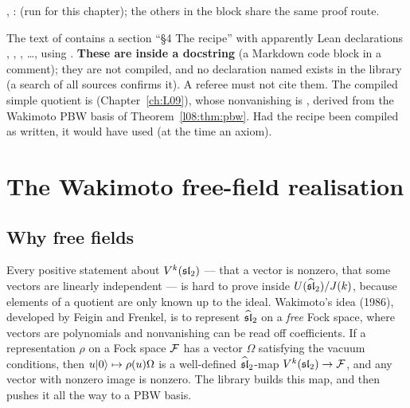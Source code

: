 \begin{status}
\allowbreak{}\allowbreak{}\allowbreak{}\allowbreak{}\allowbreak{}\allowbreak{}, \allowbreak{}\allowbreak{}\allowbreak{}\allowbreak{}\allowbreak{}:
\lean{[propext, Classical.}\allowbreak{}\allowbreak\lean{sound]} (run for this chapter); the others in the block share
the same proof route.
\end{status}

\begin{warning}[title={A documentation-only definition of $L_k(\mathfrak{sl}_2)$}]
The text of  contains a section ``\S4 The recipe''
with apparently Lean declarations \allowbreak{}, \allowbreak{},
, \ldots, using . \textbf{These are inside a docstring} (a Markdown
code block in a  comment); they are not compiled, and no declaration named
 exists in the library (a search of all  sources confirms it). A referee
must not cite them. The compiled simple quotient is \allowbreak{}
(Chapter~\ref{ch:L09}), whose nonvanishing is \allowbreak{}\allowbreak{}\allowbreak{}\allowbreak{},
derived from the Wakimoto PBW basis of Theorem~\ref{l08:thm:pbw}. Had the recipe been compiled as
written, it would have used  (at the time an axiom).
\end{warning}
\section{The Wakimoto free-field realisation}\label{l08:sec:wakimoto}

\subsection{Why free fields}

Every positive statement about $V^k(\mathfrak{sl}_2)$ --- that a vector is nonzero, that some vectors are
linearly independent --- is hard to prove inside $U(\widehat{\mathfrak{sl}}_2)/J(k)$, because elements of a quotient
are only known up to the ideal. Wakimoto's idea (1986), developed by Feigin and Frenkel, is to
represent $\widehat{\mathfrak{sl}}_2$ on a \emph{free} Fock space, where vectors are polynomials and nonvanishing can
be read off coefficients. If a representation $\rho$ on a Fock space $\mathcal{F}$ has a vector $\Omega$
satisfying the vacuum conditions, then $u|0\rangle\mapsto\rho(u)\Omega$ is a well-defined
$\widehat{\mathfrak{sl}}_2$-map $V^k(\mathfrak{sl}_2)\to\mathcal{F}$, and any vector with nonzero image is nonzero. The library
builds this map, and then pushes it all the way to a PBW basis.

